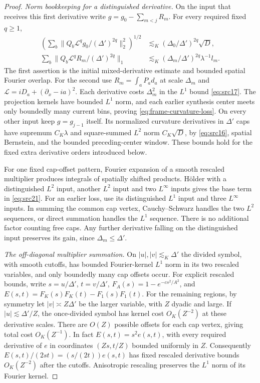 \begin{proof}
\emph{Norm bookkeeping for a distinguished derivative.}
On the input that receives this first derivative write
$g=g_0-\sum_{m<j}R_m$.  For every required fixed $q\geq1$,
\begin{align}
 \left(\sum_b\|Q_b\mathcal L^qg_0/(\Delta')^{2q}\|_2^2\right)^{1/2}
 &\lesssim_K(\Delta_0/\Delta')^{2q}\sqrt D,
 \label{eq:frame-curvature-base}\\
 \sum_b\|Q_b\mathcal L^qR_m/(\Delta')^{2q}\|_1
 &\lesssim_K(\Delta_m/\Delta')^{2q}\lambda^{-1}l_m.
 \label{eq:frame-curvature-loss}
\end{align}
The first assertion is the initial mixed-derivative estimate and
bounded spatial Fourier overlap.  For the second use
$R_m=\int_aP_ad_a$ at scale $\Delta_m$ and
$\mathcal L=iD_a+(\partial_x-ia)^2$.
Each derivative costs $\Delta_m^2$ in the $L^1$ bound
\eqref{eq:src17}.  The projection kernels have bounded $L^1$ norm,
and each earlier synthesis center meets only boundedly many current
bins, proving \eqref{eq:frame-curvature-loss}.
On every other input keep $g=g_{j-1}$ itself.  Its normalized
curvature derivatives in $\Delta'$ caps have supremum
$C_K\lambda$ and square-summed $L^2$ norm $C_K\sqrt D$, by
\eqref{eq:src16}, spatial Bernstein, and the bounded preceding-center
window.  These bounds hold for the fixed extra derivative orders
introduced below.

For one fixed cap-offset pattern, Fourier expansion of a smooth
rescaled multiplier produces integrals of spatially shifted products.
H\"older with a distinguished $L^2$ input, another $L^2$ input and
two $L^\infty$ inputs gives the base term in \eqref{eq:src21}.
For an earlier loss, use its distinguished $L^1$ input and three
$L^\infty$ inputs.  In summing the common cap vertex, Cauchy--Schwarz
handles the two $L^2$ sequences, or direct summation handles the
$L^1$ sequence.  There is no additional factor counting free caps.
Any further derivative falling on the distinguished input preserves
its gain, since $\Delta_m\leq\Delta'$.

\emph{The off-diagonal multiplier summation.}
On $|u|,|v|\lesssim_K\Delta'$ the divided symbol, with smooth
cutoffs, has bounded Fourier-kernel $L^1$ norm in its two rescaled
variables, and only boundedly many cap offsets occur.
For explicit rescaled bounds, write $s=u/\Delta'$, $t=v/\Delta'$,
$F_A(s)=1-e^{-cs^2/A^2}$, and
$E(s,t)=F_K(s)F_K(t)-F_1(s)F_1(t)$.
For the remaining regions, by symmetry let
$|v|\asymp Z\Delta'$ be the larger variable, with $Z$ dyadic and
large.  If $|u|\lesssim\Delta'/Z$, the once-divided symbol has kernel
cost $O_K(Z^{-2})$ at these derivative scales.  There are $O(Z)$
possible offsets for each cap vertex, giving total cost $O_K(Z^{-1})$.
In fact $E(s,t)=s^2e(s,t)$, with every required derivative of $e$
in coordinates $(Zs,t/Z)$ bounded uniformly in $Z$.
Consequently $E(s,t)/(2st)=(s/(2t))e(s,t)$ has fixed rescaled
derivative bounds $O_K(Z^{-2})$ after the cutoffs.  Anisotropic
rescaling preserves the $L^1$ norm of its Fourier kernel.


\end{proof}
